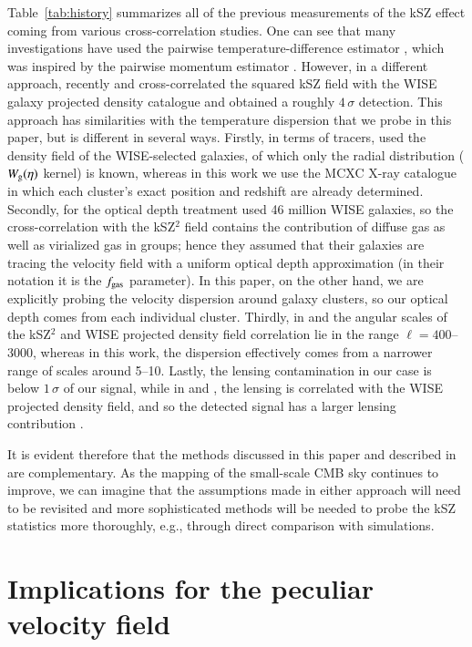 \documentclass[traditabstract, longauth]{aa}
\newcommand{\1}{\'\i }
\begin{document}
Table~\ref{tab:history} summarizes all of the previous measurements of the kSZ
effect coming from various cross-correlation studies.  One can see that many
investigations have used the pairwise temperature-difference estimator
\citep{Handetal2012}, which was inspired by the pairwise momentum estimator
\citep{ferreiraetal99}.  However, in a different approach, recently
\citet{Hill16} and \citet{Ferraro16} cross-correlated the squared kSZ field
with the WISE galaxy projected density catalogue and obtained a roughly
$4\,\sigma$
detection. This approach has similarities with the temperature dispersion that
we probe in this paper, but is different in several ways.  Firstly, in terms
of tracers, \citet{Hill16} used the density field of the WISE-selected
galaxies, of which only the radial distribution ($W_{\rm g}(\eta)$ kernel) is
known, whereas in this work we use the MCXC X-ray catalogue in  which each
cluster's exact position and redshift are already determined.  Secondly, for
the optical depth treatment \citet{Hill16} used 46 million WISE galaxies, so
the cross-correlation with the kSZ$^2$ field contains the contribution of
diffuse gas as well as virialized gas in groups; hence they assumed that their
galaxies are tracing the velocity field with a uniform optical depth
approximation (in their notation it is the $f_{\rm gas}$ parameter). In this
paper, on the other hand, we are explicitly probing the velocity dispersion
around galaxy clusters, so our optical depth comes from each individual
cluster.  Thirdly, in \citet{Hill16} and \citet{Ferraro16} the angular scales
of the kSZ$^2$ and WISE projected density field correlation lie in the range
$\ell=400$--3000, whereas in this work, the dispersion effectively comes from
a narrower range of scales around 5\arcmin--10\arcmin.  Lastly, the
lensing contamination in our case is below $1\,\sigma$ of our signal, while in
\citet{Hill16} and \citet{Ferraro16}, the lensing is correlated with the WISE
projected density field, and so the detected signal has a larger lensing
contribution \citep[figure 1 in][]{Hill16}.

It is evident therefore that the methods discussed in this paper and described
in \citet{Hill16} are complementary.  As the mapping of the small-scale CMB
sky continues to improve, we can imagine that the assumptions made in either
approach will need to be revisited and more sophisticated methods will be
needed to probe the kSZ statistics more thoroughly, e.g., through direct
comparison with simulations.


\section{Implications for the peculiar velocity field}
\label{sec:velocity}
\end{document}
